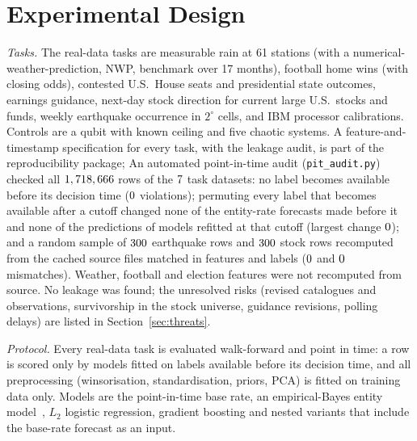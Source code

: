 \documentclass[journal]{IEEEtran}
\theoremstyle{definition}
\begin{document}
\section{Experimental Design}\label{sec:design}
\emph{Tasks.} The real-data tasks are measurable rain at 61 stations (with a numerical-weather-prediction, NWP, benchmark over 17 months), football home wins (with closing odds), contested U.S.\ House seats and presidential state outcomes, earnings guidance, next-day stock direction for current large U.S.\ stocks and funds, weekly earthquake occurrence in $2^\circ$ cells, and IBM processor calibrations. Controls are a qubit with known ceiling and five chaotic systems. A feature-and-timestamp specification for every task, with the leakage audit, is part of the reproducibility package; An automated point-in-time audit (\texttt{pit\_audit.py}) checked all $1,718,666$ rows of the $7$ task datasets: no label becomes available before its decision time ($0$ violations); permuting every label that becomes available after a cutoff changed none of the entity-rate forecasts made before it and none of the predictions of models refitted at that cutoff (largest change $0$); and a random sample of $300$ earthquake rows and $300$ stock rows recomputed from the cached source files matched in features and labels ($0$ and $0$ mismatches). Weather, football and election features were not recomputed from source. No leakage was found; the unresolved risks (revised catalogues and observations, survivorship in the stock universe, guidance revisions, polling delays) are listed in Section~\ref{sec:threats}.

\emph{Protocol.} Every real-data task is evaluated walk-forward and point in time: a row is scored only by models fitted on labels available before its decision time, and all preprocessing (winsorisation, standardisation, priors, PCA) is fitted on training data only. Models are the point-in-time base rate, an empirical-Bayes entity model~\cite{robbins1956empirical,efron1975data}, $L_2$ logistic regression, gradient boosting and nested variants that include the base-rate forecast as an input.
\end{document}
